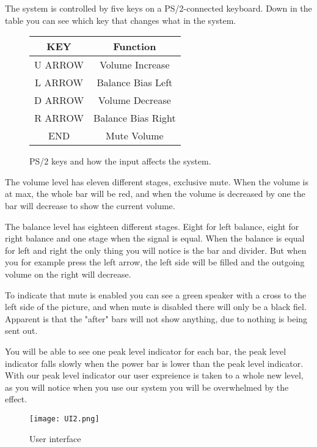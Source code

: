 The system is controlled by five keys on a PS/2-connected keyboard. Down in the table you can see which key that changes what in the system.


\begin{figure}[h]
\centering
\begin{tabular}{|c|c|}
\hline
KEY & Function\\ \hline
U ARROW & Volume Increase\\ \hline
L ARROW & Balance Bias Left\\ \hline
D ARROW &  Volume Decrease\\ \hline
R ARROW &  Balance Bias Right\\ \hline
END		&  Mute Volume\\ \hline
\end{tabular}
\caption{PS/2 keys and how the input affects the system.}
\label{fig:scancodes}
\end{figure}


The volume level has eleven different stages, exclusive mute. When the volume is at max, the whole bar will be red, and when the volume is decreased by one the bar will decrease to show the current volume.

The balance level has eighteen different stages. Eight for left balance, eight for right balance and one stage when the signal is equal. When the balance is equal for left and right the only thing you will notice is the bar and divider. But when you for example press the left arrow, the left side will be filled and the outgoing volume on the right will decrease.

To indicate that mute is enabled you can see a green speaker with a cross to the left side of the picture, and when mute is disabled there will only be a black fiel. Apparent is that the "after" bars will not show anything, due to nothing is being sent out. 

You will be able to see one peak level indicator for each bar, the peak level indicator falls slowly when the power bar is lower than the peak level indicator. With our peak level indicator our user expreience is taken to a whole new level, as you will notice when you use our system you will be overwhelmed by the effect.

\begin{figure}[h]
	\centering
        \texttt{[image: UI2.png]}
       \caption{User interface}
        \label{fig:user interface}
\end{figure}


